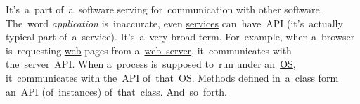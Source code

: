 \label{api}
It's~a~part of~a~software serving for~communication with other software.
The~word \textit{application} is~inaccurate, even \hyperref[applicationprocessprogramservicethread]{services} can~have~API (it's~actually typical part of~a~service).
It's~a~very broad term.
For~example, when a~browser is~requesting \hyperref[internetweb]{web} pages from a~\hyperref[webserver]{web~server}, it~communicates with the~server~API\@.
When a~process is~supposed to~run under an~\hyperref[os]{OS}, it~communicates with the~API of~that~OS\@.
Methods defined in~a~class form an~API (of~instances) of~that~class.
And~so~forth.
